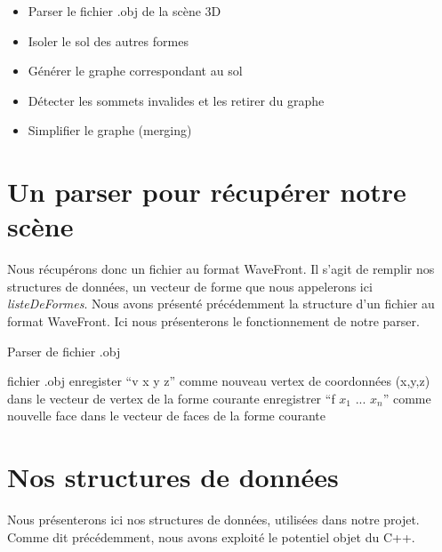 \documentclass[a4paper,12pt]{report}
\begin{document}
\begin{itemize}
 \item Parser le fichier .obj de la scène 3D
 \item Isoler le sol des autres formes
 \item Générer le graphe correspondant au sol
 \item Détecter les sommets invalides et les retirer du graphe
 \item Simplifier le graphe (merging)
\end{itemize}


\section{Un parser pour récupérer notre scène}

Nous récupérons donc un fichier au format WaveFront. Il s'agit de remplir nos structures de données, un vecteur de forme que nous appelerons ici \textit{listeDeFormes}.
Nous avons présenté précédemment la structure d'un fichier au format WaveFront. Ici nous présenterons le fonctionnement de notre parser.

\begin{algorithm}[t]
\caption{Parser de fichier .obj}
\label{parser}
\begin{algorithmic}[1]
\REQUIRE fichier .obj
    \STATE enregister ``v x y z'' comme nouveau vertex de coordonnées (x,y,z) dans le vecteur de vertex de la forme courante
  \ELSE
    \STATE enregistrer ``f $x_{1}$ ... $x_{n}$'' comme nouvelle face dans le vecteur de faces de la forme courante
    \ENDIF
  \ENDIF
\ENDFOR
\end{algorithmic}
\end{algorithm}
 

\section{Nos structures de données}

Nous présenterons ici nos structures de données, utilisées dans notre projet. Comme dit précédemment, nous avons exploité le potentiel objet du C++.
\end{document}
